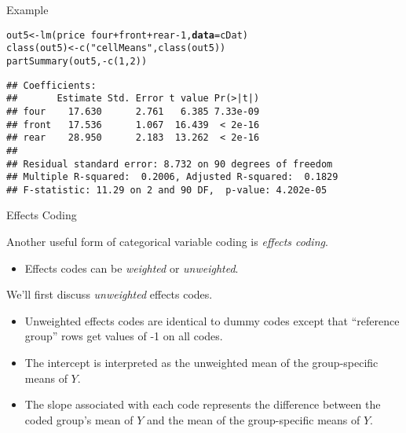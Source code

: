 \documentclass{beamer}\usepackage[]{graphicx}\usepackage[]{color}
\makeatletter
\newcommand{\hlnum}[1]{\textcolor[rgb]{0.69,0.494,0}{#1}}%
\newcommand{\hlstr}[1]{\textcolor[rgb]{0.749,0.012,0.012}{#1}}%
\newcommand{\hlopt}[1]{\textcolor[rgb]{0,0,0}{#1}}%
\newcommand{\hlstd}[1]{\textcolor[rgb]{0,0,0}{#1}}%
\newcommand{\hlkwb}[1]{\textcolor[rgb]{0,0.341,0.682}{#1}}%
\newcommand{\hlkwc}[1]{\textcolor[rgb]{0,0,0}{\textbf{#1}}}%
\newcommand{\hlkwd}[1]{\textcolor[rgb]{0.004,0.004,0.506}{#1}}%
\newenvironment{kframe}{%
 \def\at@end@of@kframe{}%
 \ifinner\ifhmode%
  \def\at@end@of@kframe{\end{minipage}}%
  \begin{minipage}{\columnwidth}%
 \fi\fi%
 \def\FrameCommand##1{\hskip\@totalleftmargin \hskip-\fboxsep
 \colorbox{shadecolor}{##1}\hskip-\fboxsep
     \hskip-\linewidth \hskip-\@totalleftmargin \hskip\columnwidth}%
 \MakeFramed {\advance\hsize-\width
   \@totalleftmargin\z@ \linewidth\hsize
   \@setminipage}}%
 {\par\unskip\endMakeFramed%
 \at@end@of@kframe}
\newenvironment{knitrout}{}{} %
\makeatother
\begin{document}
\begin{frame}{Example}
\begin{knitrout}\footnotesize
{}\color{fgcolor}\begin{kframe}
\begin{alltt}
\hlstd{out5} \hlkwb{<-} \hlkwd{lm}\hlstd{(price} \hlopt{~} \hlstd{four} \hlopt{+} \hlstd{front} \hlopt{+} \hlstd{rear} \hlopt{-} \hlnum{1}\hlstd{,} \hlkwc{data} \hlstd{= cDat)}
\hlkwd{class}\hlstd{(out5)} \hlkwb{<-} \hlkwd{c}\hlstd{(}\hlstr{"cellMeans"}\hlstd{,} \hlkwd{class}\hlstd{(out5))}
\hlkwd{partSummary}\hlstd{(out5,} \hlopt{-}\hlkwd{c}\hlstd{(}\hlnum{1}\hlstd{,} \hlnum{2}\hlstd{))}
\end{alltt}
\begin{verbatim}
## Coefficients:
##       Estimate Std. Error t value Pr(>|t|)
## four    17.630      2.761   6.385 7.33e-09
## front   17.536      1.067  16.439  < 2e-16
## rear    28.950      2.183  13.262  < 2e-16
## 
## Residual standard error: 8.732 on 90 degrees of freedom
## Multiple R-squared:  0.2006,	Adjusted R-squared:  0.1829 
## F-statistic: 11.29 on 2 and 90 DF,  p-value: 4.202e-05
\end{verbatim}
\end{kframe}
\end{knitrout}

\end{frame}

\watermarkon %

\begin{frame}{Effects Coding}
  
  Another useful form of categorical variable coding is \emph{effects coding}.
  \vc
  \begin{itemize}
  \item Effects codes can be \emph{weighted} or \emph{unweighted}.
  \end{itemize}
  \vb
  \pause
  We'll first discuss \emph{unweighted} effects codes.
  \vc
  \begin{itemize}
  \item Unweighted effects codes are identical to dummy codes except that 
    ``reference group'' rows get values of -1 on all codes.
    \vc
  \item The intercept is interpreted as the unweighted mean of the 
    group-specific means of $Y$.
    \vc
  \item The slope associated with each code represents the difference between 
    the coded group's mean of $Y$ and the mean of the group-specific means of 
    $Y$.
  \end{itemize}
  
\end{frame}
\end{document}
